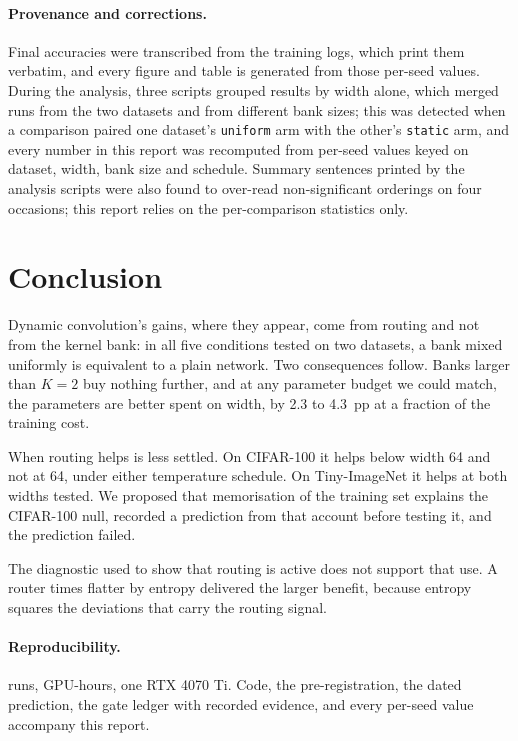 \documentclass[10pt,a4paper]{article}
\begin{document}
\paragraph{Provenance and corrections.} Final accuracies were transcribed
from the training logs, which print them verbatim, and every figure and
table is generated from those per-seed values. During the analysis, three
scripts grouped results by width alone, which merged runs from the two
datasets and from different bank sizes; this was detected when a
comparison paired one dataset's \texttt{uniform} arm with the other's
\texttt{static} arm, and every number in this report was recomputed from
per-seed values keyed on dataset, width, bank size and schedule. Summary
sentences printed by the analysis scripts were also found to over-read
non-significant orderings on four occasions; this report relies on the
per-comparison statistics only.

\section{Conclusion}

Dynamic convolution's gains, where they appear, come from routing and not
from the kernel bank: in all five conditions tested on two datasets, a
bank mixed uniformly is equivalent to a plain network. Two consequences
follow. Banks larger than $K=2$ buy nothing further, and at any
parameter budget we could match, the parameters are better spent on
width, by 2.3 to \SI{4.3}{pp} at a fraction of the training cost.

When routing helps is less settled. On CIFAR-100 it helps below width 64
and not at 64, under either temperature schedule. On Tiny-ImageNet it
helps at both widths tested. We proposed that memorisation of the
training set explains the CIFAR-100 null, recorded a prediction from that
account before testing it, and the prediction failed.

The diagnostic used to show that routing is active does not support that
use. A router  times flatter by entropy delivered the larger
benefit, because entropy squares the deviations that carry the routing
signal.

\paragraph{Reproducibility.}  runs,  GPU-hours, one RTX
4070 Ti. Code, the pre-registration, the dated prediction, the gate
ledger with recorded evidence, and every per-seed value accompany this
report.
\end{document}
